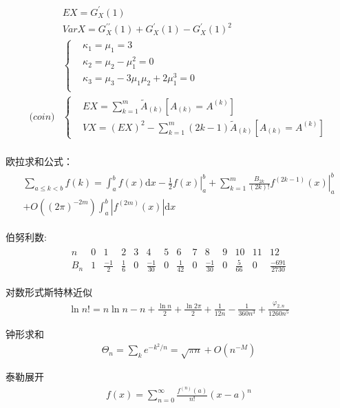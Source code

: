 \documentclass[fontset=windows]{article}
\begin{document}
\begin{align}
      & EX = G_X^\prime (1)                                         \\
      & VarX=G_X^{\prime\prime} (1)+G_X^\prime (1)-G_X^\prime (1)^2 \\
      & \left\{
     \begin{aligned}
           & \kappa_1=\mu_1=3                      \\
           & \kappa_2=\mu_2-\mu_1^2=0              \\
           & \kappa_3=\mu_3-3\mu_1\mu_2+2\mu_1^3=0 \\
     \end{aligned}
     \right.                                                        \\
     \mathrm(coin)
      & \left\{
     \begin{aligned}
           & EX = \sum_{k=1}^m \widetilde A_{(k)}[A_{(k)}=A^{(k)}]               \\
           & VX = (EX)^2-\sum_{k=1}^m (2k-1) \widetilde A_{(k)}[A_{(k)}=A^{(k)}]
     \end{aligned}
     \right.                                                        \\
\end{align}

欧拉求和公式：
\begin{align}
     \begin{gathered}
          \sum_{a \le k<b} f(k)=\int_{a}^{b} f(x) \mathrm{d} x-\left.\frac{1}{2} f(x)\right|_{a} ^{b}+\left.\sum_{k=1}^{m} \frac{B_{2 k}}{(2 k) !} f^{(2 k-1)}(x)\right|_{a} ^{b} \\
          +O\left((2 \pi)^{-2 m}\right) \int_{a}^{b}\left|f^{(2 m)}(x)\right| \mathrm{d} x
     \end{gathered}
\end{align}

伯努利数:
\begin{align}
     \begin{array}{c|ccccccccccccc}
          n            & 0 & 1            & 2           & 3 & 4             & 5 & 6            & 7 & 8             & 9 & 10           & 11 & 12                \\
          \hline B_{n} & 1 & \frac{-1}{2} & \frac{1}{6} & 0 & \frac{-1}{30} & 0 & \frac{1}{42} & 0 & \frac{-1}{30} & 0 & \frac{5}{66} & 0  & \frac{-691}{2730}
     \end{array}
\end{align}

对数形式斯特林近似
\begin{align}
     \ln n !=n \ln n-n+\frac{\ln n}{2}+\frac{\ln 2\pi}{2}+\frac{1}{12 n}-\frac{1}{360 n^{3}}+\frac{\varphi_{2, n}}{1260 n^{5}}
\end{align}

钟形求和
\begin{align}
     \Theta_{n}=\sum_{k} e^{-k^2/n} = \sqrt{\pi n} + O(n^{-M})
\end{align}

泰勒展开
\begin{align*}
     f(x) = \sum_{n=0}^{\infty}\frac{f^{(n)}(a)}{n!}(x-a)^n
\end{align*}
\end{document}
